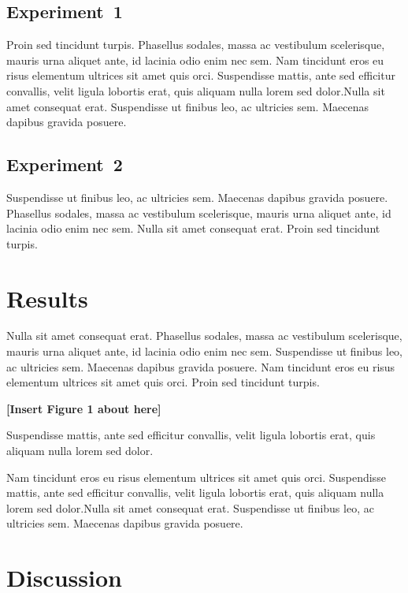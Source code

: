 \documentclass[12pt,oneside]{article}
\begin{document}
\subsection{Experiment~1}\label{experiment-1}

Proin sed tincidunt turpis. Phasellus sodales, massa ac vestibulum
scelerisque, mauris urna aliquet ante, id lacinia odio enim nec sem. Nam
tincidunt eros eu risus elementum ultrices sit amet quis orci.
Suspendisse mattis, ante sed efficitur convallis, velit ligula lobortis
erat, quis aliquam nulla lorem sed dolor.Nulla sit amet consequat erat.
Suspendisse ut finibus leo, ac ultricies sem. Maecenas dapibus gravida
posuere.

\subsection{Experiment~2}\label{experiment-2}

Suspendisse ut finibus leo, ac ultricies sem. Maecenas dapibus gravida
posuere. Phasellus sodales, massa ac vestibulum scelerisque, mauris urna
aliquet ante, id lacinia odio enim nec sem. Nulla sit amet consequat
erat. Proin sed tincidunt turpis.

\section{Results}\label{results}

Nulla sit amet consequat erat. Phasellus sodales, massa ac vestibulum
scelerisque, mauris urna aliquet ante, id lacinia odio enim nec sem.
Suspendisse ut finibus leo, ac ultricies sem. Maecenas dapibus gravida
posuere. Nam tincidunt eros eu risus elementum ultrices sit amet quis
orci. Proin sed tincidunt turpis.

\begin{center}\bfseries [Insert Figure 1 about here]\end{center}

Suspendisse mattis, ante sed efficitur convallis, velit ligula lobortis
erat, quis aliquam nulla lorem sed dolor.

Nam tincidunt eros eu risus elementum ultrices sit amet quis orci.
Suspendisse mattis, ante sed efficitur convallis, velit ligula lobortis
erat, quis aliquam nulla lorem sed dolor.Nulla sit amet consequat erat.
Suspendisse ut finibus leo, ac ultricies sem. Maecenas dapibus gravida
posuere.

\section{Discussion}\label{discussion}
\end{document}
